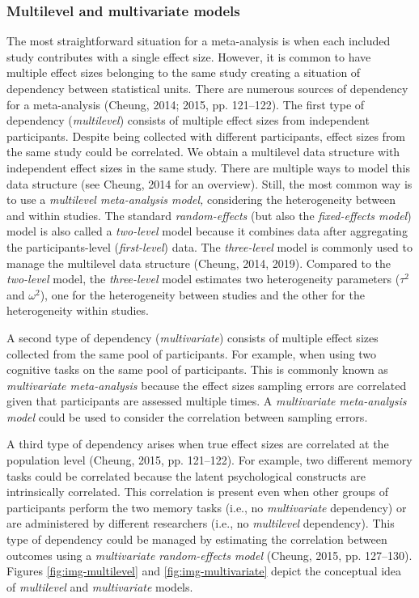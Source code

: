 \documentclass[
  man,floatsintext]{apa6}
\begin{document}
\normalsize

\hypertarget{multilevel-and-multivariate-models}{%
\subsubsection{Multilevel and multivariate models}\label{multilevel-and-multivariate-models}}

The most straightforward situation for a meta-analysis is when each included study contributes with a single effect size. However, it is common to have multiple effect sizes belonging to the same study creating a situation of dependency between statistical units. There are numerous sources of dependency for a meta-analysis (Cheung, 2014; 2015, pp. 121--122). The first type of dependency (\emph{multilevel}) consists of multiple effect sizes from independent participants. Despite being collected with different participants, effect sizes from the same study could be correlated. We obtain a multilevel data structure with independent effect sizes in the same study. There are multiple ways to model this data structure (see Cheung, 2014 for an overview). Still, the most common way is to use a \emph{multilevel meta-analysis model,} considering the heterogeneity between and within studies. The standard \emph{random-effects} (but also the \emph{fixed-effects model}) model is also called a \emph{two-level} model because it combines data after aggregating the participants-level (\emph{first-level}) data. The \emph{three-level} model is commonly used to manage the multilevel data structure (Cheung, 2014, 2019). Compared to the \emph{two-level} model, the \emph{three-level} model estimates two heterogeneity parameters (\(\tau^{2}\) and \(\omega^{2}\)), one for the heterogeneity between studies and the other for the heterogeneity within studies.

A second type of dependency (\emph{multivariate}) consists of multiple effect sizes collected from the same pool of participants. For example, when using two cognitive tasks on the same pool of participants. This is commonly known as \emph{multivariate meta-analysis} because the effect sizes sampling errors are correlated given that participants are assessed multiple times. A \emph{multivariate meta-analysis model} could be used to
consider the correlation between sampling errors.

A third type of dependency arises when true effect sizes are correlated at the population level (Cheung, 2015, pp. 121--122). For example, two different memory tasks could be correlated because the latent psychological constructs are intrinsically correlated. This correlation is present even when other groups of participants perform the two memory tasks (i.e., no \emph{multivariate} dependency) or are administered by different researchers (i.e., no \emph{multilevel} dependency). This type of dependency could be managed by estimating the correlation between outcomes using a \emph{multivariate random-effects model} (Cheung, 2015, pp. 127--130). Figures \ref{fig:img-multilevel} and \ref{fig:img-multivariate} depict the conceptual idea of \emph{multilevel} and \emph{multivariate} models.
\end{document}
